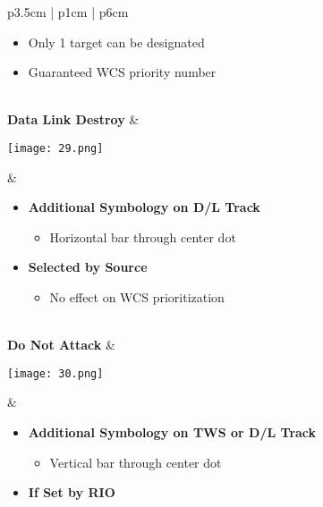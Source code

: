 \documentclass[8pt,usenames,dvipsnames,twoside]{article}
\begin{document}
\begin{center}
\begin{longtable}{p{3.5cm} | p{1cm} |  p{6cm}}
\begin{minipage}[t]{\linewidth}
\begin{itemize}
						\begin{itemize}
							\item Only 1 target can be designated
							\item Guaranteed WCS priority number
						\end{itemize}
					\end{itemize}
				\end{minipage} \\
				\midrule
				\textbf{Data Link Destroy }&
				\begin{minipage}[t]{\linewidth}
					\vspace{-7pt}
					\centering
					\texttt{[image: 29.png]}
				\end{minipage} &  
				\begin{minipage}[t]{\linewidth}
					\vspace{-7pt}
					\begin{itemize}
						\item \textbf{Additional Symbology on D/L Track}
						\begin{itemize}
							\item Horizontal bar through center dot
						\end{itemize}
						\item \textbf{Selected by Source}
						\begin{itemize}
							\item No effect on WCS prioritization
						\end{itemize}
					\end{itemize}
				\end{minipage} \\
				\midrule
				\textbf{Do Not Attack} &
				\begin{minipage}[t]{\linewidth}
					\vspace{-7pt}
					\centering
					\texttt{[image: 30.png]}
				\end{minipage} &  
				\begin{minipage}[t]{\linewidth}
					\vspace{-7pt}
					\begin{itemize}
						\item \textbf{Additional Symbology on TWS or D/L Track}
						\begin{itemize}
							\item Vertical bar through center dot
						\end{itemize}
						\item \textbf{If Set by RIO}
						\begin{itemize}

\end{itemize}
\end{itemize}
\end{minipage}
\end{longtable}
\end{center}
\end{document}
